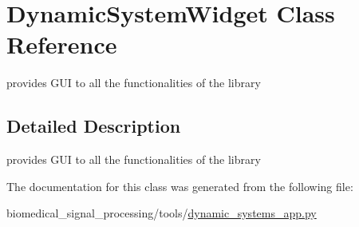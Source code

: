 \hypertarget{classDynamicSystemWidget}{}\section{Dynamic\+System\+Widget Class Reference}
\label{classDynamicSystemWidget}


provides G\+UI to all the functionalities of the library  




\subsection{Detailed Description}
provides G\+UI to all the functionalities of the library 

The documentation for this class was generated from the following file\+:\begin{DoxyCompactItemize}
\item 
biomedical\+\_\+signal\+\_\+processing/tools/\hyperlink{dynamic__systems__app_8py}{dynamic\+\_\+systems\+\_\+app.\+py}\end{DoxyCompactItemize}
